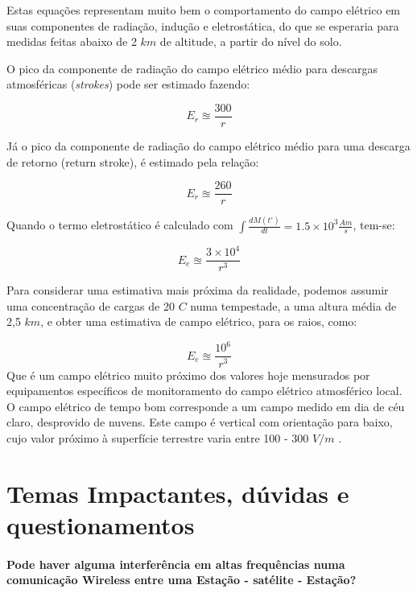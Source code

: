 \documentclass[a4paper, 12pt, onecolumn,singlespacing]{article}
\begin{document}
	Estas equações representam muito bem o comportamento do campo elétrico em suas componentes de radiação, indução e eletrostática, do que se esperaria para medidas feitas abaixo de 2 $km$ de altitude, a partir do nível do solo.
	
	
	O pico da componente de radiação do campo elétrico médio para descargas atmosféricas (\textit{strokes}) pode ser estimado fazendo:
	
	\begin{equation}
		E_r \approxeq \frac{300}{r}
	\end{equation}
	
	Já o pico da componente de radiação do campo elétrico médio para uma descarga de retorno (return stroke), é estimado	pela relação:
	
	\begin{equation}
		E_r \approxeq \frac{260}{r}
	\end{equation}
	
	Quando o termo eletrostático é calculado com $\int \frac{dM(t')}{dt} = 1.5 \times 10^3 \frac{Am}{s}$, tem-se:
	
	\begin{equation}
		E_e \approxeq \frac{3 \times 10^4}{r^3}
	\end{equation}
	
	Para considerar uma estimativa mais próxima da realidade, podemos assumir uma concentração de cargas de 20 $C$ numa tempestade, a uma altura média de 2,5 $km$, e obter uma estimativa de campo elétrico, para os raios, como:
	
	\begin{equation}
		E_e \approxeq \frac{10^6}{r^3}
	\end{equation}
	Que é um campo elétrico muito próximo dos valores hoje mensurados por equipamentos específicos de monitoramento do campo elétrico atmosférico local. O campo elétrico de tempo bom corresponde a um campo medido em dia de céu	claro, desprovido de nuvens. Este campo é vertical com orientação para baixo, cujo valor próximo à superfície terrestre varia entre 100 - 300 $V/m$
	.
	\section{Temas Impactantes, dúvidas e questionamentos}
	
	\paragraph{Pode haver alguma interferência em altas frequências numa comunicação Wireless entre uma Estação - satélite - Estação?}
	
\end{document}
